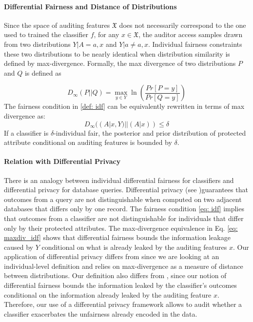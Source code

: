 \documentclass{article}
\begin{document}
\paragraph{Differential Fairness and Distance of Distributions}
Since the space of auditing features $\mathfrak{X}$ does not necessarily correspond to the one used to trained the classifier $f$, for any $x\in \mathfrak{X}$, the auditor access samples drawn from two distributions $Y|A=a, x$ and $Y|a\neq a, x$. Individual fairness constraints these two distributions to be nearly identical when distribution similarity is defined by max-divergence. Formally, the max divergence of two distributions $P$ and $Q$ is defined as 

\begin{equation}
D_{\infty}(P||Q) = \max_{y\in Y}\ln\left(\frac{Pr[P=y]}{Pr[Q=y]}\right)
\end{equation}
The fairness condition in \ref{def: idf} can be equivalently rewritten in terms of max divergence as:
\begin{equation}
\label{eq: maxdiv_idf}
D_{\infty}((A|x, Y)||(A| x)) \leq \delta
\end{equation}
If a classifier is $\delta$-individual fair, the posterior and prior distribution of protected attribute conditional on auditing features is bounded by $\delta$. 

\paragraph{Relation with Differential Privacy}
There is an analogy between individual differential fairness for classifiers and differential privacy for database queries. Differential privacy (see \cite{dwork2014algorithmic} )guarantees that outcomes from a query are not distinguishable when computed on two adjacent databases that differs only by one record. The fairness condition \eqref{eq: idf} implies that outcomes from a classifier are not distinguishable for individuals that differ only by their protected attributes. The max-divergence equivalence in Eq. \eqref{eq: maxdiv_idf} shows that differential fairness bounds the information leakage caused by $Y$ conditional on what is already leaked by the auditing features $x$. Our application of differential privacy differs from \cite{jagielski2018differentially} since we are looking at an individual-level definition and relies on max-divergence as a measure of distance between distributions.  Our definition also differs from \cite{foulds2018intersectional}, since our notion of differential fairness bounds the information leaked by the classifier's outcomes conditional on the information already leaked by the auditing feature $x$. Therefore, our use of a differential privacy framework allows to audit whether a classifier exacerbates the unfairness already encoded in the data.
\end{document}
